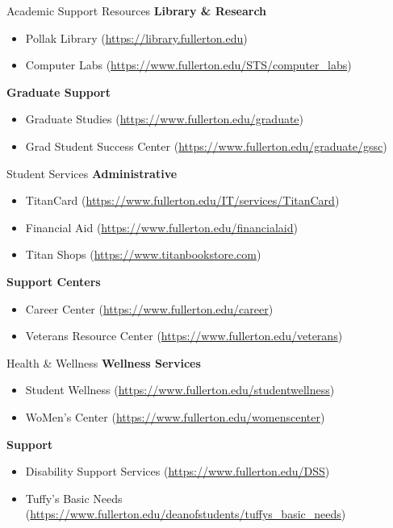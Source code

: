 \documentclass[10pt]{beamer}
\begin{document}
\begin{frame}{Academic Support Resources}
\textbf{Library \& Research}
\begin{itemize}
  \item Pollak Library \small(\url{https://library.fullerton.edu})
  \item Computer Labs \small(\url{https://www.fullerton.edu/STS/computer_labs})
\end{itemize}

\textbf{Graduate Support}
\begin{itemize}
  \item Graduate Studies \small(\url{https://www.fullerton.edu/graduate})
  \item Grad Student Success Center \small(\url{https://www.fullerton.edu/graduate/gssc})
\end{itemize}
\end{frame}

\begin{frame}{Student Services}
\textbf{Administrative}
\begin{itemize}
  \item TitanCard \small(\url{https://www.fullerton.edu/IT/services/TitanCard})
  \item Financial Aid \small(\url{https://www.fullerton.edu/financialaid})
  \item Titan Shops \small(\url{https://www.titanbookstore.com})
\end{itemize}

\textbf{Support Centers}
\begin{itemize}
  \item Career Center \small(\url{https://www.fullerton.edu/career})
  \item Veterans Resource Center \small(\url{https://www.fullerton.edu/veterans})
\end{itemize}
\end{frame}

\begin{frame}{Health \& Wellness}
\textbf{Wellness Services}
\begin{itemize}
  \item Student Wellness \small(\url{https://www.fullerton.edu/studentwellness})
  \item WoMen's Center \small(\url{https://www.fullerton.edu/womenscenter})
\end{itemize}

\textbf{Support}
\begin{itemize}
  \item Disability Support Services \small(\url{https://www.fullerton.edu/DSS})
  \item Tuffy's Basic Needs \small(\url{https://www.fullerton.edu/deanofstudents/tuffys_basic_needs})
\end{itemize}
\end{frame}
\end{document}

